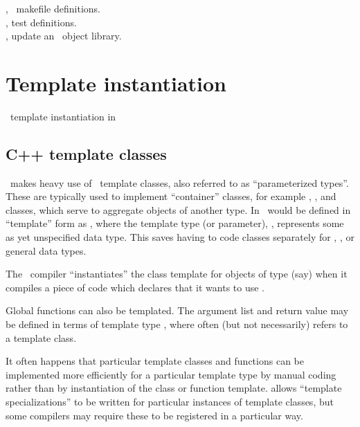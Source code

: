 , \aipspp\ makefile definitions.\\
, test  definitions.\\
, update an \aipspp\ object library.

 
\newpage
\section{Template instantiation}
\label{Template instantiation}



\cplusplus\ template instantiation in \aipspp
 
\subsection*{C++ template classes}

\aipspp\ makes heavy use of \cplusplus\ template classes, also referred to as
``parameterized types''.  These are typically used to implement ``container''
classes, for example , , and  classes, which
serve to aggregate objects of another type.  In \cplusplus\,  would
be defined in ``template'' form as , where the template type (or
parameter), , represents some as yet unspecified data type.  This
saves having to code  classes separately for ,
, or general  data types. 

The \cplusplus\ compiler ``instantiates'' the  class template for
objects of type  (say) when it compiles a piece of code which
declares that it wants to use .

Global functions can also be templated.  The argument list and return value
may be defined in terms of template type , where  often (but
not necessarily) refers to a template class.

It often happens that particular template classes and functions can be
implemented more efficiently for a particular template type by manual coding
rather than by instantiation of the class or function template.  \cplusplus
allows ``template specializations'' to be written for particular instances of
template classes, but some compilers may require these to be registered in
a particular way.
 
